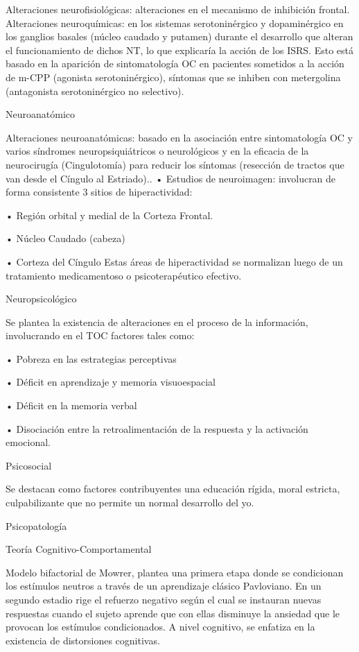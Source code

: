 Alteraciones neurofisiológicas: alteraciones en el mecanismo de inhibición frontal. Alteraciones neuroquímicas: en los sistemas serotoninérgico y dopaminérgico en los ganglios basales (núcleo caudado y putamen) durante el desarrollo que alteran el funcionamiento de dichos NT, lo que explicaría la acción de los ISRS. Esto está basado en la aparición de sintomatología OC en pacientes sometidos a la acción de m-CPP (agonista serotoninérgico), síntomas que se inhiben con metergolina (antagonista serotoninérgico no selectivo).

Neuroanatómico

Alteraciones neuroanatómicas: basado en la asociación entre sintomatología OC y varios síndromes neuropsiquiátricos o neurológicos y en la eficacia de la neurocirugía (Cingulotomía) para reducir los síntomas (resección de tractos que van desde el Cíngulo al Estriado).. • Estudios de neuroimagen: involucran de forma consistente 3 sitios de hiperactividad:

• Región orbital y medial de la Corteza Frontal.

• Núcleo Caudado (cabeza)

• Corteza del Cíngulo Estas áreas de hiperactividad se normalizan luego de un tratamiento medicamentoso o psicoterapéutico efectivo.

Neuropsicológico

Se plantea la existencia de alteraciones en el proceso de la información, involucrando en el TOC factores tales como:

• Pobreza en las estrategias perceptivas

• Déficit en aprendizaje y memoria visuoespacial

• Déficit en la memoria verbal

• Disociación entre la retroalimentación de la respuesta y la activación emocional.

Psicosocial

Se destacan como factores contribuyentes una educación rígida, moral estricta, culpabilizante que no permite un normal desarrollo del yo.

Psicopatología

Teoría Cognitivo-Comportamental

Modelo bifactorial de Mowrer, plantea una primera etapa donde se condicionan los estímulos neutros a través de un aprendizaje clásico Pavloviano. En un segundo estadio rige el refuerzo negativo según el cual se instauran nuevas respuestas cuando el sujeto aprende que con ellas disminuye la ansiedad que le provocan los estímulos condicionados. A nivel cognitivo, se enfatiza en la existencia de distorsiones cognitivas.

